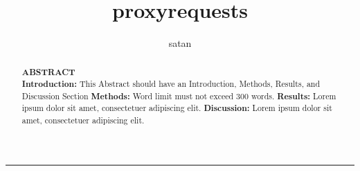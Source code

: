 \documentclass[preprint, onecolumn]{report}
\title{proxyrequests}
\author{satan}
\begin{document}
\onecolumn
\date{}
\maketitle

\begin{center}
    \noindent\rule{.9\textwidth}{.4pt}
\end{center}

\begin{abstract}
    \noindent\textbf{\large ABSTRACT} \\
    \textbf{Introduction:} This Abstract should have an Introduction, Methods, Results, and Discussion Section
    \noindent \textbf{Methods:} Word limit must not exceed 300 words.
    \noindent \textbf{Results:} Lorem ipsum dolor sit amet, consectetuer adipiscing elit.
    \noindent \textbf{Discussion:} Lorem ipsum dolor sit amet, consectetuer adipiscing
    elit.
\end{abstract}
\end{document}
